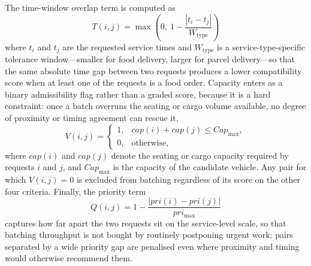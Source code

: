 \documentclass[conference]{IEEEtran}
\begin{document}
The time-window overlap term is computed as
\begin{equation}
T(i,j)=\max\!\left(0,\ 1-\frac{|t_i-t_j|}{W_{\text{type}}}\right)
\end{equation}
where $t_i$ and $t_j$ are the requested service times and $W_{\text{type}}$ is
a service-type-specific tolerance window---smaller for food delivery, larger
for parcel delivery---so that the same absolute time gap between two requests
produces a lower compatibility score when at least one of the requests is a
food order. Capacity enters as a binary admissibility flag rather than a graded score,
because it is a hard constraint: once a batch overruns the seating or cargo volume available, no degree of
proximity or timing agreement can rescue it,
\begin{equation}
V(i,j)=\begin{cases}
1, & cap(i)+cap(j)\le Cap_{\max},\\
0, & \text{otherwise},
\end{cases}
\end{equation}
where $cap(i)$ and $cap(j)$ denote the seating or cargo capacity required by
requests $i$ and $j$, and $Cap_{\max}$ is the capacity of the candidate
vehicle. Any pair for which $V(i,j)=0$ is excluded from batching regardless of
its score on the other four criteria. Finally, the priority term
\begin{equation}
Q(i,j)=1-\frac{|pri(i)-pri(j)|}{pri_{\max}}
\end{equation}
captures how far apart the two requests sit on the service-level scale, so
that batching throughput is not bought by routinely postponing urgent work: pairs separated by a wide priority gap are penalised even where proximity and
timing would otherwise recommend them.
\end{document}

